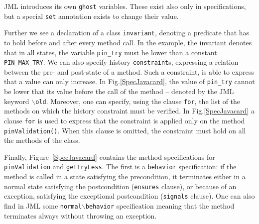 
JML introduces its own \texttt{ghost} variables. 
These exist also only in specifications, but a special
\texttt{set} annotation exists to change their value.%


Further we see a declaration of a class \texttt{invariant}, denoting a
predicate that has to hold before and after every method call. In the 
example, the invariant denotes that in all states, the variable 
\texttt{pin\_try} must be lower than a constant \texttt{PIN\_MAX\_TRY}.
We can also specify  history \texttt{constraint}s, expressing 
a relation between the pre- and post-state of a method. Such
a constraint, is able to express that a value  can only increase. 
In Fig.\ref{SpecJavacard}, the value of \texttt{pin\_try} cannot be
lower that its value before the call of the method -- denoted by the
JML keyword \texttt{$\backslash$old}. Moreover, one can specify, using
the clause \texttt{for}, the list of the methods on which the 
history constraint must be verified. In Fig.\ref{SpecJavacard} 
a clause \texttt{for} is used to express that the 
constraint is applied only on the method  
\texttt{pinValidation()}. When this clause is omitted,
the constraint must hold on all the methods of the class.


Finally, Figure~\ref{SpecJavacard} contains the method specifications for
\texttt{pinValidation} and \texttt{getTryLess}. The first is a
\texttt{behavior} specification:  if the
method is called in a state satisfying the precondition, it terminates
either in a normal state satisfying the postcondition (\texttt{ensures} clause), or because of
an exception, satisfying the exceptional postcondition
(\texttt{signals} clause).
One can also find in JML some \texttt{normal$\backslash$behavior} specification 
meaning that the method terminates always without throwing an exception.



